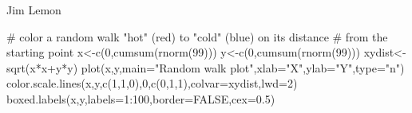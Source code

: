 \begin{Author}\relax
Jim Lemon
\end{Author}
\begin{SeeAlso}\relax
{}
\end{SeeAlso}
\begin{Examples}
\begin{ExampleCode}
 # color a random walk "hot" (red) to "cold" (blue) on its distance
 # from the starting point
 x<-c(0,cumsum(rnorm(99)))
 y<-c(0,cumsum(rnorm(99)))
 xydist<-sqrt(x*x+y*y)
 plot(x,y,main="Random walk plot",xlab="X",ylab="Y",type="n")
 color.scale.lines(x,y,c(1,1,0),0,c(0,1,1),colvar=xydist,lwd=2)
 boxed.labels(x,y,labels=1:100,border=FALSE,cex=0.5)
\end{ExampleCode}
\end{Examples}

